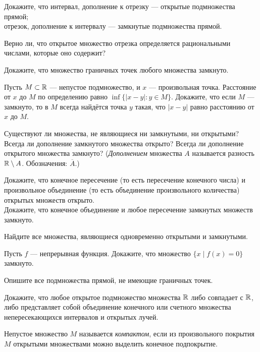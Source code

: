 \documentclass[a4paper,12pt]{article}
\begin{document}
Докажите, что
 интервал, дополнение к отрезку --- открытые подмножества прямой;
\\ отрезок, дополнение к интервалу --- замкнутые подмножества прямой.


Верно ли, что открытое множество отрезка определяется рациональными числами, которые оно содержит?


Докажите, что множество граничных точек любого множества замкнуто.


Пусть $M\subset\mathbb{R}$ — непустое подмножество, и $x$ — произвольная точка.
Расстояние от $x$ до $M$ по определению равно $\inf \{|x-y|\colon y\in M\}$.
Докажите, что если $M$ — замкнуто, то в $M$ всегда найдётся точка $y$ такая, что $|x-y|$ равно расстоянию от $x$ до $M$.


Существуют ли множества, не являющиеся ни замкнутыми, ни открытыми?
\\
Всегда ли дополнение замкнутого множества открыто?
Всегда ли дополнение открытого множества замкнуто?
({\itshape Дополнением} множества $A$ называется разность $\mathbb{R}\setminus A$. Обозначения: $\overline{A}$.)



 Докажите, что конечное пересечение
(то есть пересечение конечного числа) и произвольное объединение
(то есть объединение произвольного количества)
открытых множеств открыто.
\\
Докажите, что конечное объединение и любое пересечение замкнутых множеств замкнуто.

Найдите все множества, являющиеся одновременно открытыми и замкнутыми.


  Пусть $f$ --- непрерывная функция.
  Докажите, что множество $\{x\mid f(x)=0\}$ замкнуто.




Опишите все подмножества прямой, не имеющие граничных точек.

Докажите, что любое открытое подмножество множества $\mathbb{R}$ либо совпадает с $\mathbb{R}$,
либо представляет собой объединение конечного или счетного множества непересекающихся интервалов и открытых лучей.


\newpage


Непустое множество $M$ называется {\itshape компактом},
если из произвольного покрытия $M$ открытыми множествами
можно выделить конечное подпокрытие.
\end{document}
